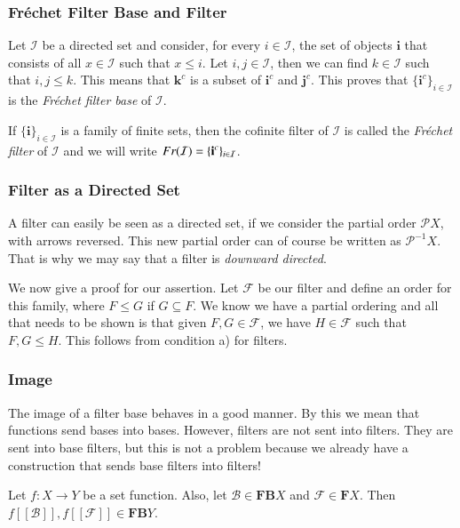 \documentclass [12pt]{book}
\begin{document}
\subsubsection{Fr\'echet Filter Base and Filter} Let $\mathcal I$ be a directed set and consider, for every $i\in\mathcal I$, the set of objects $\textbf{i}$ that consists of all $x\in\mathcal I$ such that $x\leq i$. Let $i,j\in\mathcal I$, then we can find $k\in\mathcal I$ such that $i,j\leq k$. This means that $\textbf{k}^c$ is a subset of $\textbf{i}^c$ and $\textbf{j}^c$.  This proves that $\{\textbf{i}^c\}_{i\in\mathcal{I}}$ is the \textit{Fr\'echet filter base} of $\mathcal I$.

If $\{\textbf{i}\}_{i\in\mathcal{I}}$ is a family of finite sets, then the cofinite filter of $\mathcal{I}$ is called the \textit{Fr\'echet filter} of $\mathcal{I}$ and we will write $Fr(\mathcal{I})=\{\textbf i^c\}_{i\in\mathcal I}$.

\subsubsection{Filter as a Directed Set} A filter can easily be seen as a directed set, if we consider the partial order $\mathcal{P}X$, with arrows reversed. This new partial order can of course be written as $\mathcal{P}^{-1}X$. That is why we may say that a filter is \textit{downward directed}.

We now give a proof for our assertion. Let $\mathcal{F}$ be our filter and define an order for this family, where $F\leq G$ if $G\subseteq F$. We know we have a partial ordering and all that needs to be shown is that given $F,G\in\mathcal{F}$, we have $H\in\mathcal{F}$ such that $F,G\leq H$. This follows from condition a) for filters.

\subsubsection{Image} The image of a filter base behaves in a good manner. By this we mean that functions send bases into bases. However, filters are not sent into filters. They are sent into base filters, but this is not a problem because we already have a construction that sends base filters into filters!

\begin{proposition}Let $f:X\rightarrow Y$ be a set function. Also, let  $\mathcal{B}\in\textbf{FB}X$ and $\mathcal{F}\in\textbf{F}X$. Then $f[[\mathcal{B}]],f[[\mathcal{F}]]\in\textbf{FB}Y$.\end{proposition}
\end{document}
